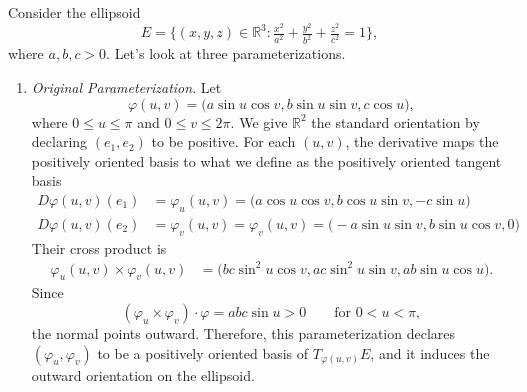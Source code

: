 	\begin{example}
	  \label{ex:determining-orientation-of-an-ellipsoid}
		Consider the ellipsoid
		\begin{equation}
			E = \{(x,y,z) \in \mathbb{R}^3 : \tfrac{x^2}{a^2} + \tfrac{y^2}{b^2} + \tfrac{z^2}{c^2} = 1 \},
		\end{equation}
		where $a,b,c > 0$. Let's look at three parameterizations.
		\begin{enumerate}
			\item \textit{Original Parameterization}. Let
				\begin{equation}
					\varphi(u,v) = \big( a\sin u \cos v, b\sin u \sin v, c\cos u \big),
				\end{equation}
				where $0 \leq u \leq \pi$ and $0 \leq v \leq 2\pi$. We give $\mathbb{R}^2$ the standard orientation by declaring $(e_1,e_2)$ to be positive. For each $(u,v)$, the derivative maps the positively oriented basis to what we define as the positively oriented tangent basis 
				\begin{align}
					D\varphi(u,v)(e_1) & = \varphi_u(u,v) = \big( a\cos u \cos v, b\cos u \sin v, -c\sin u \big) \\
					D\varphi(u,v)(e_2) & = \varphi_v(u,v) = \varphi_v(u,v) = \big( -a\sin u \sin v, b\sin u \cos v, 0 \big)
				\end{align}
				Their cross product is
				\begin{align}
					\varphi_u(u,v) \times \varphi_v(u,v)
					&=
					\big(
					bc\sin^2 u \cos v,
					ac\sin^2 u \sin v,
					ab\sin u \cos u
					\big).
				\end{align}
				Since
				\begin{equation}
					(\varphi_u \times \varphi_v)\cdot \varphi = abc\sin u > 0 \qquad \text{for } 0<u<\pi,
				\end{equation}
				the normal points outward. Therefore, this parameterization declares $(\varphi_u,\varphi_v)$ to be a positively oriented basis of $T_{\varphi(u,v)}E$, and it induces the outward orientation on the ellipsoid.


\end{enumerate}
\end{example}
